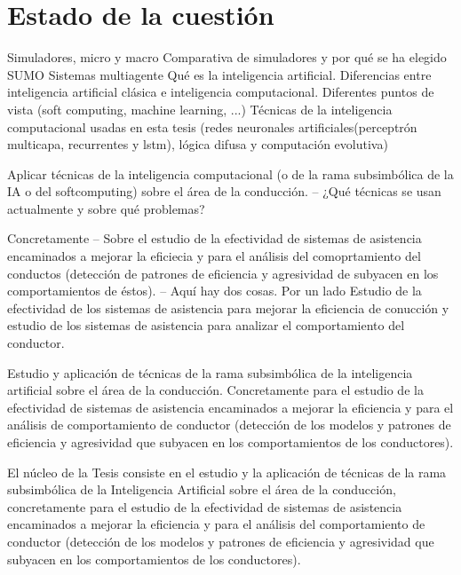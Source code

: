 \chapter{Estado de la cuestión}
\label{ch:state-of-the-art}

Simuladores, micro y macro
Comparativa de simuladores y por qué se ha elegido SUMO
Sistemas multiagente
Qué es la inteligencia artificial.
Diferencias entre inteligencia artificial clásica e inteligencia computacional. Diferentes puntos de vista (soft computing, machine learning, ...)
Técnicas de la inteligencia computacional usadas en esta tesis (redes neuronales artificiales(perceptrón multicapa, recurrentes y lstm), lógica difusa y computación evolutiva)



Aplicar técnicas de la inteligencia computacional (o de la rama subsimbólica de la IA o del softcomputing) sobre el área de la conducción. -- ¿Qué técnicas se usan actualmente y sobre qué problemas?

Concretamente -- Sobre el estudio de la efectividad de sistemas de asistencia encaminados a mejorar la eficiecia y para el análisis del comoprtamiento del conductos (detección de patrones de eficiencia y agresividad de subyacen en los comportamientos de éstos). -- Aquí hay dos cosas. Por un lado Estudio de la efectividad de los sistemas de asistencia para mejorar la eficiencia de conucción y estudio de los sistemas de asistencia para analizar el comportamiento del conductor.


Estudio y aplicación de técnicas de la rama subsimbólica de la inteligencia artificial sobre el área de la conducción. Concretamente para el estudio de la efectividad de sistemas de asistencia encaminados a mejorar la eficiencia y para el análisis de comportamiento de conductor (detección de los modelos y patrones de eficiencia y agresividad que subyacen en los comportamientos de los conductores).

El núcleo de la Tesis consiste en el estudio y la aplicación de técnicas de la rama subsimbólica de la Inteligencia Artificial sobre el área de la conducción, concretamente para el estudio de la efectividad de sistemas de asistencia encaminados a mejorar la eficiencia y para el análisis del comportamiento de conductor (detección de los modelos y patrones de eficiencia y agresividad que subyacen en los comportamientos de los conductores).
